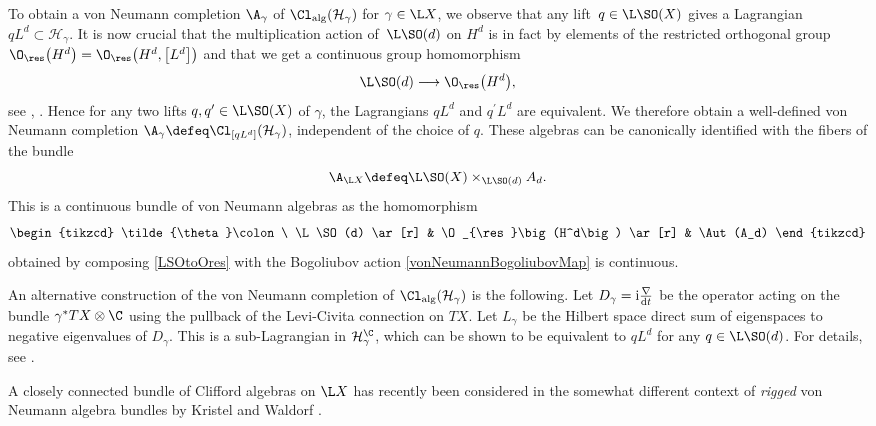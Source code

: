 To obtain a von Neumann completion $\A_\gamma$ of $\Cl_{\mathrm{alg}}(\mathcal{H}_\gamma)$ for $\gamma \in \L X$, we observe that any lift~${q \in \L \SO(X)}$ gives a Lagrangian $q L^d \subset \mathcal{H}_\gamma$.
It is now crucial that the multiplication action of~$\L\SO(d)$ on $H^d$ is in fact by elements of the restricted orthogonal group $\O_{\res}\big(H^d\big) = \O_{\res}\big(H^d, \big[L^d\big]\big)$ and that we get a continuous group homomorphism
\begin{equation} \label{LSOtoOres}
 \L\SO(d) \longrightarrow \O_{\res}\big(H^d\big),
\end{equation}
see \cite[Proposition~6.3.1]{PressleySegal}, \cite[Proposition~3.23]{KristelWaldorf1}.
Hence for any two lifts $q, q^\prime \in \L \SO(X)$ of $\gamma$, the Lagrangians $q L^d$ and $q^\prime L^d$ are equivalent.
We therefore obtain a well-defined von Neumann completion $\A_\gamma \defeq \Cl_{[q L^d]}(\mathcal{H}_\gamma)$, independent of the choice of $q$.
These algebras can be canonically identified with the fibers of the bundle
\begin{equation} \label{vNBundleAsAssociatedBundle}
 \A_{\L X} \defeq \L \SO(X) \times_{\L\SO(d)} A_d.
\end{equation}
This is a continuous bundle of von Neumann algebras as the homomorphism
\begin{equation} \label{ThetaTilde}
\begin{tikzcd}
\tilde{\theta}\colon \ \L \SO(d) \ar[r] & \O_{\res}\big(H^d\big) \ar[r] & \Aut(A_d)
\end{tikzcd}
\end{equation}
obtained by composing \eqref{LSOtoOres} with the Bogoliubov action \eqref{vonNeumannBogoliubovMap} is continuous.

\begin{Remark}
An alternative construction of the von Neumann completion of $\Cl_{\mathrm{alg}}(\mathcal{H}_\gamma)$ is the following.
Let $D_\gamma = \mathrm{i}\frac{\nabla}{{\rm d}t}$ be the operator acting on the bundle $\gamma^*T X \otimes \C$ using the pullback of the Levi-Civita connection on $TX$.
Let $L_\gamma$ be the Hilbert space direct sum of eigenspaces to negative eigenvalues of $D_\gamma$.
This is a sub-Lagrangian in $\mathcal{H}_\gamma^\C$, which can be shown to be equivalent to $q L^d$ for any $q \in \L\SO(d)$.
For details, see \cite[Section~1.3]{LudewigSpinorBundle}.
\end{Remark}

\begin{Remark}
A closely connected bundle of Clifford algebras on $\L X$ has recently been considered in the somewhat different context of \emph{rigged} von Neumann algebra bundles by Kristel and Waldorf \cite{KristelWaldorf2}.
\end{Remark}

